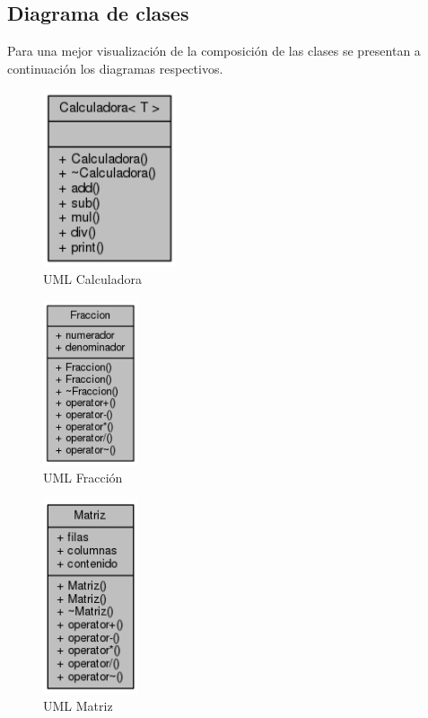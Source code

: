 \documentclass[11pt]{article}
\begin{document}
\newpage
\subsection{Diagrama de clases}
Para una mejor visualización de la composición de las clases se presentan a continuación los diagramas respectivos.

\begin{figure}[htbp]
\centering
\includegraphics[width=0.35\textwidth]{img/UMLcalc.png}
\caption{\label{fig:umlcalc} UML Calculadora}
\end{figure}

\begin{figure}[htbp]
\centering
\includegraphics[width=0.25\textwidth]{img/UMLFrac.png}
\caption{\label{fig:umlfrac} UML Fracción}
\end{figure}

\begin{figure}[htbp]
\centering
\includegraphics[width=0.25\textwidth]{img/UMLmat.png}
\caption{\label{fig:umlmat} UML Matriz}
\end{figure}
\end{document}
